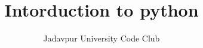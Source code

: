 \documentclass{beamer}
\title{Intorduction to python}
\author{Jadavpur University Code Club}
\date{}
\begin{document}
\maketitle
\begin{center}
\end{center}
\end{document}

